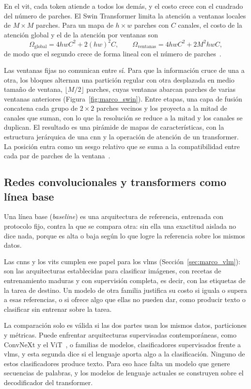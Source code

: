 En el \gls{vit}, cada token atiende a todos los demás, y el costo crece con el cuadrado del número de parches.
El Swin Transformer limita la atención a ventanas locales de $M \times M$ parches. Para un mapa de
$h \times w$ parches con $C$ canales, el costo de la atención global y el de la atención por ventanas son
\begin{equation}
    \Omega_{\text{global}} = 4hwC^2 + 2(hw)^2C, \qquad \Omega_{\text{ventanas}} = 4hwC^2 + 2M^2hwC,
    \label{eq:marco_swin_costo}
\end{equation}
de modo que el segundo crece de forma lineal con el número de parches~\cite{liu2021swin}.

Las ventanas fijas no comunican entre sí. Para que la información cruce de una a otra, los bloques alternan una
partición regular con otra desplazada en medio tamaño de ventana, $\lfloor M/2 \rfloor$ parches, cuyas
ventanas abarcan parches de varias ventanas anteriores (Figura~\ref{fig:marco_swin}). Entre etapas, una capa
de fusión concatena cada grupo de $2 \times 2$ parches vecinos y los proyecta a la mitad de canales que suman,
con lo que la resolución se reduce a la mitad y los canales se duplican. El resultado es una pirámide de mapas
de características, con la estructura jerárquica de una \gls{cnn} y la operación de atención de un
transformer. La posición entra como un sesgo relativo que se suma a la compatibilidad entre cada par de parches
de la ventana~\cite{liu2021swin}.



\subsection{Redes convolucionales y transformers como línea base}
\label{sec:marco_baseline_visual}

Una línea base (\emph{baseline}) es una arquitectura de referencia, entrenada con protocolo fijo, contra la
que se compara otra: sin ella una exactitud aislada no dice nada, porque es alta o baja según lo que logre la
referencia sobre los mismos datos.

Las \glspl{cnn} y los \glspl{vit} cumplen ese papel para los \glspl{vlm}
(Sección~\ref{sec:marco_vlm}): son las arquitecturas establecidas para clasificar imágenes, con recetas de
entrenamiento maduras y con supervisión completa, es decir, con las etiquetas de la tarea de destino. Un
modelo de otra familia justifica su costo si iguala o supera a esas referencias, o si ofrece algo que ellas
no pueden dar, como producir texto o clasificar sin entrenar sobre la tarea.

La comparación solo es válida si las dos partes usan los mismos datos, particiones y métricas. Puede
enfrentar arquitecturas supervisadas contemporáneas, como ConvNeXt y el
ViT~\cite{dosovitskiy2021image,liu2022convnet}, o familias de modelos, clasificadores supervisados frente a
\glspl{vlm}, y esta segunda dice si el lenguaje aporta algo a la clasificación. Ninguno de estos
clasificadores produce texto. Para eso hace falta un modelo que genere secuencias de palabras, y los modelos de
lenguaje actuales se construyen sobre el decodificador del transformer.
